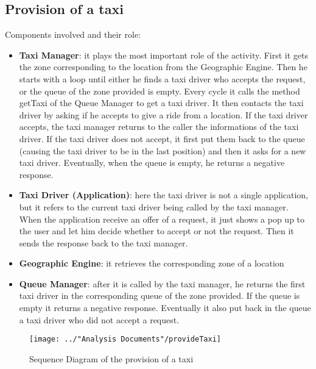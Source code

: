 \subsection{Provision of a taxi}\label{seq:provisionOfATaxi}
Components involved and their role:
\begin{itemize}
	\item \textbf{Taxi Manager}: it plays the most important role of the activity. First it gets the zone corresponding to the location from the Geographic Engine. Then he starts with a loop until either he finds a taxi driver who accepts the request, or the queue of the zone provided is empty. Every cycle it calls the method getTaxi of the Queue Manager to get a taxi driver. It then contacts the taxi driver by asking if he accepts to give a ride from a location. If the taxi driver accepts, the taxi manager returns to the caller the informations of the taxi driver. If the taxi driver does not accept, it first put them back to the queue (causing the taxi driver to be in the last position) and then it asks for a new taxi driver. Eventually, when the queue is empty, he returns a negative response.
	\item \textbf{Taxi Driver (Application)}: here the taxi driver is not a single application, but it refers to the current taxi driver being called by the taxi manager. When the application receive an offer of a request, it just shows a pop up to the user and let him decide whether to accept or not the request. Then it sends the response back to the taxi manager.
	\item \textbf{Geographic Engine}: it retrieves the corresponding zone of a location
	\item \textbf{Queue Manager}: after it is called by the taxi manager, he returns the first taxi driver in the corresponding queue of the zone provided. If the queue is  empty it returns a negative response. Eventually it also put back in the queue a taxi driver who did not accept a request.
\end{itemize}
\begin{figure}[H]
	\centering
	\texttt{[image: ../"Analysis Documents"/provideTaxi]}
	\label{fig:provideTaxi_seq}
	\caption{Sequence Diagram of the provision of a taxi}
\end{figure}